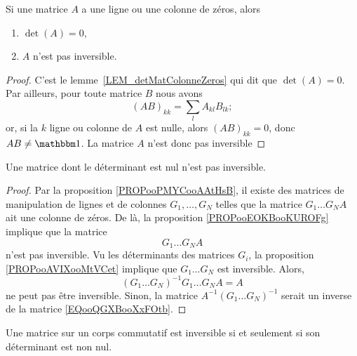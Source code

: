 \begin{proposition}     \label{PROPooEOKBooKUROFg}
    Si une matrice \( A\) a une ligne ou une colonne de zéros, alors
    \begin{enumerate}
        \item
            \( \det(A)=0\),
        \item
            \( A\) n'est pas inversible.
    \end{enumerate}
\end{proposition}

\begin{proof}
  C'est le lemme~\ref{LEM_detMatColonneZeros} qui dit que \( \det(A) = 0 \). Par ailleurs, pour toute matrice \( B \) nous avons
  \begin{equation}
    (AB)_{kk} = \sum_l A_{kl} B_{lk};
  \end{equation}
  or, si la \( k \)\ieme{} ligne ou colonne de \( A \) est nulle, alors \( (AB)_{kk} = 0 \), donc \( AB \neq \mtu \). La matrice \( A \) n'est donc pas inversible
\end{proof}

\begin{proposition}     \label{PROPooVUDJooLWjmSI}
    Une matrice dont le déterminant est nul n'est pas inversible.
\end{proposition}

\begin{proof}
    Par la proposition \ref{PROPooPMYCooAAtHsB}, il existe des matrices de manipulation de lignes et de colonnes \( G_1,\ldots, G_N\) telles que la matrice \( G_1\ldots G_NA\) ait une colonne de zéros. De là, la proposition \ref{PROPooEOKBooKUROFg} implique que la matrice
    \begin{equation}        \label{EQooQGXBooXxFOtb}
        G_1\ldots G_NA
    \end{equation}
    n'est pas inversible. Vu les déterminants des matrices \( G_i\),  la proposition \ref{PROPooAVIXooMtVCet} implique que \( G_1\ldots G_N\) est inversible. Alors,
    \begin{equation}
        (G_1\ldots G_N)^{-1}G_1\dots G_NA = A
    \end{equation}
    ne peut pas être inversible. Sinon, la matrice \( A^{-1}(G_1\ldots G_N)^{-1}\) serait un inverse de la matrice \eqref{EQooQGXBooXxFOtb}.
\end{proof}

\begin{theorem}     \label{THOooSNXWooSRjleb}
    Une matrice sur un corps commutatif est inversible si et seulement si son déterminant est non nul.
\end{theorem}

